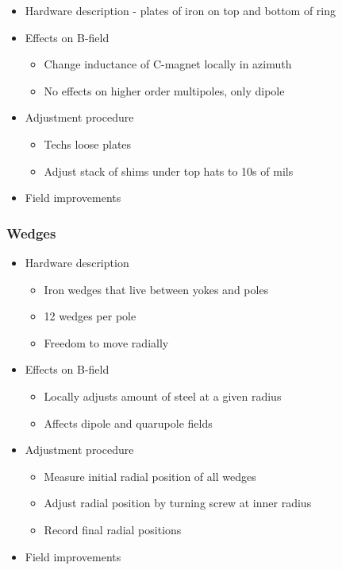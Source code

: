 \begin{itemize}
  \item Hardware description - plates of iron on top and bottom of ring
  \item Effects on B-field
    \begin{itemize}
      \item Change inductance of C-magnet locally in azimuth
      \item No effects on higher order multipoles, only dipole
    \end{itemize}
  \item Adjustment procedure
    \begin{itemize}
      \item Techs loose plates
      \item Adjust stack of shims under top hats to 10s of mils
    \end{itemize}
  \item Field improvements
\end{itemize}

\subsubsection{Wedges}

\begin{itemize}
  \item Hardware description
    \begin{itemize}
      \item Iron wedges that live between yokes and poles
      \item 12 wedges per pole
      \item Freedom to move radially
    \end{itemize}
  \item Effects on B-field
    \begin{itemize}
      \item Locally adjusts amount of steel at a given radius
      \item Affects dipole and quarupole fields
    \end{itemize}
  \item Adjustment procedure
    \begin{itemize}
      \item Measure initial radial position of all wedges
      \item Adjust radial position by turning screw at inner radius
      \item Record final radial positions
    \end{itemize}
  \item Field improvements
\end{itemize}

